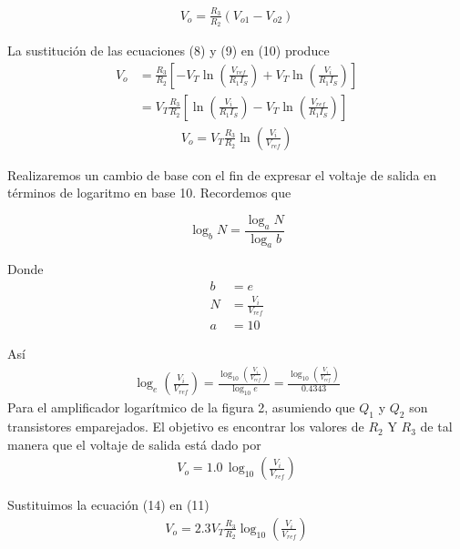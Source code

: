 \documentclass[12pt,a4paper]{article}
\begin{document}
	\begin{align}
		V_o = \frac{R_3}{R_2}(V_{o1} - V_{o2})
	\end{align}
	
	La sustitución de las ecuaciones (8) y (9) en (10) produce
	\begin{align}
		V_o &= \frac{R_3}{R_2} \left[ - V_T \ln \left( \frac{V_{ref}}{R_1I_S} \right) + V_T \ln \left( \frac{V_i}{R_1I_S} \right) \right]\nonumber\\
		&= V_T \frac{R_3}{R_2} \left[ \ln \left( \frac{V_i}{R_1I_S} \right) - V_T \ln \left( \frac{V_{ref}}{R_1I_S} \right)  \right]\nonumber
	\end{align}
	\begin{align}
		V_o = V_T \frac{R_3}{R_2} \ln \left( \frac{V_i}{V_{ref}} \right)
	\end{align}

	Realizaremos un cambio de base con el fin de expresar el voltaje de salida en términos de logaritmo en base 10. Recordemos que
	\begin{tcolorbox}[colback=red!5!white,colframe=red!75!black,width=(\linewidth+0.45cm)]
		\begin{equation}
			\log_{b}N = \frac{\log_{a}N}{\log_{a}b}
		\end{equation}
	\end{tcolorbox}	

	Donde 
	\begin{subequations}
		\begin{align}
			b &= e\\
			N &= \frac{V_i}{V_{ref}}\\
			a &= 10
		\end{align}
	\end{subequations}

	Así
	\begin{align}
		\log_{e}\left( \frac{V_i}{V_{ref}} \right) = \frac{ \log_{10}\left( \frac{V_i}{V_{ref}} \right) }{ \log_{10}e } = \frac{ \log_{10}\left( \frac{V_i}{V_{ref}} \right) }{0.4343}
	\end{align}
	Para el amplificador logarítmico de la figura 2, asumiendo que $Q_1$ y $Q_2$ son transistores emparejados. El objetivo es encontrar los valores de $R_2$ Y $R_3$ de tal manera que el voltaje de salida está dado por
	\begin{align}
		V_o = 1.0\, \log _{10}\left( \frac{V_i}{V_{ref}} \right)\nonumber
	\end{align}
	
	Sustituimos la ecuación (14) en (11)
	\begin{align}
		V_o = 2.3V_T \frac{R_3}{R_2} \log_{10} \left( \frac{V_i}{V_{ref}} \right)
	\end{align}
	
\end{document}
